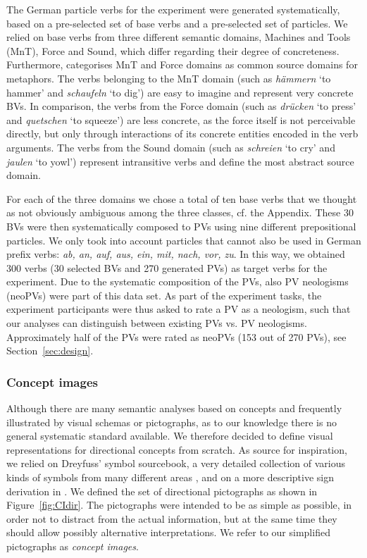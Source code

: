 \documentclass[output=paper]{langsci/langscibook}
\begin{document}
The German particle verbs for the experiment were generated
systematically, based on a pre-selected set of base verbs and a
pre-selected set of particles. We relied on base verbs from three
different semantic domains, Machines and Tools (MnT),
Force and Sound, which differ regarding their degree
of concreteness. Furthermore, \cite{Koevecses:02} categorises
MnT and Force domains as common source domains for
metaphors. The verbs belonging to the MnT domain (such as
\textit{hämmern} `to hammer' and \textit{schaufeln} `to dig') are
easy to imagine and represent very concrete BVs. In comparison, the
verbs from the Force domain (such as \textit{drücken} `to
press' and \textit{quetschen} `to squeeze') are less concrete, as
the force itself is not perceivable directly, but only through
interactions of its concrete entities encoded in the verb
arguments. The verbs from the Sound domain (such as
\textit{schreien} `to cry' and \textit{jaulen} `to yowl')
represent intransitive verbs and define the most abstract source
domain.

For each of the three domains we chose a total of ten base verbs that
we thought as not obviously ambiguous among the three classes, cf. the
Appendix. These 30 BVs were then systematically composed to PVs using
nine different prepositional particles. We only took into account
particles that cannot also be used in German prefix verbs: \textit{ab,
  an, auf, aus, ein, mit, nach, vor, zu}. In this way, we obtained 300
verbs (30 selected BVs and 270 generated PVs) as target verbs for the
experiment. Due to the systematic composition of the PVs, also PV
neologisms (neoPVs) were part of this data set. As part of the
experiment tasks, the experiment participants were thus asked to rate
a PV as a neologism, such that our analyses can distinguish between
existing PVs vs. PV neologisms. Approximately half of the PVs were
rated as neoPVs (153 out of 270 PVs), see Section~\ref{sec:design}.


\subsubsection{Concept images}
\label{sec:image-schema}

Although there are many semantic analyses based on concepts and
frequently illustrated by visual schemas or pictographs, as to our
knowledge there is no general systematic standard available. We
therefore decided to define visual representations for directional
concepts from scratch. As source for inspiration, we relied on
Dreyfuss' symbol sourcebook, a very detailed collection of various
kinds of symbols from many different areas \citep{Dreyfuss:84}, and on
a more descriptive sign derivation in \cite{Frutiger:87}. We defined
the set of directional pictographs as shown in
Figure~\ref{fig:CIdir}. The pictographs were intended to be as simple
as possible, in order not to distract from the actual information, but at the
same time they should allow possibly alternative interpretations. We
refer to our simplified pictographs as \textit{concept images}.
\end{document}
